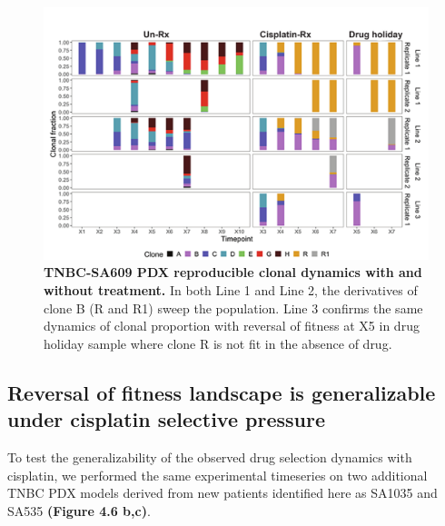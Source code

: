 \begin{figure}
\centering
\includegraphics[width=\textwidth]{Figures/SA609barplotanalysis.pdf}
	
\caption[TNBC-SA609 PDX reproducible clonal dynamics with and without treatment]
	{\small
	\textbf{TNBC-SA609 PDX reproducible clonal dynamics with and without treatment.}
	    In both Line 1 and Line 2, the derivatives of clone B (R and R1) sweep the population. Line 3 confirms the same dynamics of clonal proportion with reversal of fitness at X5 in drug holiday sample where clone R is not fit in the absence of drug.
	}
	\label{fig:SA609barplotanalysis}
\end{figure}


\subsection{Reversal of fitness landscape is generalizable under cisplatin selective pressure}
To test the generalizability of the observed drug selection dynamics with cisplatin, we performed the same experimental timeseries on two additional TNBC PDX models derived from new patients identified here as SA1035 and SA535 \textbf{(Figure 4.6 b,c)}. 

